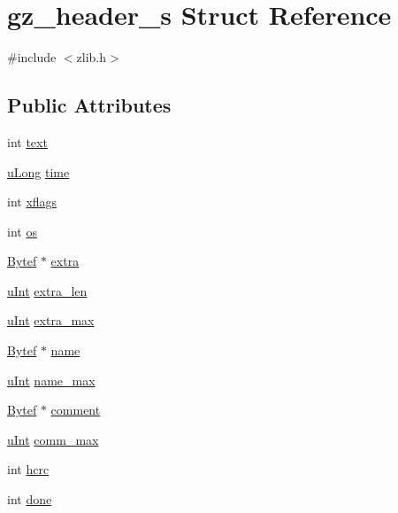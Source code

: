 \hypertarget{structgz__header__s}{}\section{gz\+\_\+header\+\_\+s Struct Reference}
\label{structgz__header__s}


{\ttfamily \#include $<$zlib.\+h$>$}

\subsection*{Public Attributes}
\begin{DoxyCompactItemize}
\item 
int \hyperlink{structgz__header__s_af94c3fadfed835a501bc1babc4b894f9}{text}
\item 
\hyperlink{zconf_8h_acd2a5701a3aecf6700d2c66c606ecb40}{u\+Long} \hyperlink{structgz__header__s_a5f00bb6f9689c1abf7a54dad449ce9d3}{time}
\item 
int \hyperlink{structgz__header__s_a40e35dc1a967c6537c6012cf5416210a}{xflags}
\item 
int \hyperlink{structgz__header__s_a2708d3180d30b0563e3c2c965865cd4f}{os}
\item 
\hyperlink{zconf_8h_aeb722a888064be47e12d05f692e0f407}{Bytef} $\ast$ \hyperlink{structgz__header__s_a397959afc459da7e296c676a3d4c1915}{extra}
\item 
\hyperlink{zconf_8h_a87d141052bcd5ec8a80812a565c70369}{u\+Int} \hyperlink{structgz__header__s_a271798915d64ae1f0d25a3a814ca0aa3}{extra\+\_\+len}
\item 
\hyperlink{zconf_8h_a87d141052bcd5ec8a80812a565c70369}{u\+Int} \hyperlink{structgz__header__s_ada4b174bf7ec0442b1091011c7342ca1}{extra\+\_\+max}
\item 
\hyperlink{zconf_8h_aeb722a888064be47e12d05f692e0f407}{Bytef} $\ast$ \hyperlink{structgz__header__s_a60ae5eee2882d1c25b3bb328972f0149}{name}
\item 
\hyperlink{zconf_8h_a87d141052bcd5ec8a80812a565c70369}{u\+Int} \hyperlink{structgz__header__s_af503d267de15a461b81dcbbfb0d628e5}{name\+\_\+max}
\item 
\hyperlink{zconf_8h_aeb722a888064be47e12d05f692e0f407}{Bytef} $\ast$ \hyperlink{structgz__header__s_a1d4fd0807e838ce4bfde54aa021e18e9}{comment}
\item 
\hyperlink{zconf_8h_a87d141052bcd5ec8a80812a565c70369}{u\+Int} \hyperlink{structgz__header__s_aa0529f45e5c08b3009cfc2a61a86aea0}{comm\+\_\+max}
\item 
int \hyperlink{structgz__header__s_a29fa8de3acff8d8c7bad61dc924d8564}{hcrc}
\item 
int \hyperlink{structgz__header__s_ab8fd11f59b76a7d031e24bede8679d9d}{done}
\end{DoxyCompactItemize}


